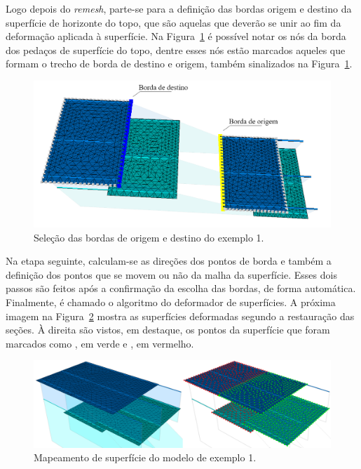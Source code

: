 Logo depois do \textit{remesh}, parte-se para a definição das bordas origem e destino da superfície de horizonte do topo, que são aquelas que deverão se unir ao fim da deformação aplicada à superfície. Na Figura~\ref{fig-example-1-4} é possível notar os nós da borda dos pedaços de superfície do topo, dentre esses nós estão marcados aqueles que formam o trecho de borda de destino e origem, também sinalizados na Figura~\ref{fig-example-1-4}.

\begin{figure} [H]
  \begin{center}
    \includegraphics[width=350pt]{images/fig-example-1-4}
    \caption{Seleção das bordas de origem e destino do exemplo 1.}\label{fig-example-1-4}
  \end{center}
\end{figure}

Na etapa seguinte, calculam-se as direções dos pontos de borda e também a definição dos pontos que se movem ou não da malha da superfície. Esses dois passos são feitos após a confirmação da escolha das bordas, de forma automática. Finalmente, é chamado o algoritmo do deformador de superfícies. A próxima imagem na Figura~\ref{fig-example-1-5} mostra as superfícies deformadas segundo a restauração das seções. À direita são vistos, em destaque, os pontos da superfície que foram marcados como , em verde e , em vermelho.

\begin{figure} [H]
  \begin{center}
    \includegraphics[width=\textwidth]{images/fig-example-1-5}
    \caption{Mapeamento de superfície do modelo de exemplo 1.}\label{fig-example-1-5}
  \end{center}
\end{figure}


